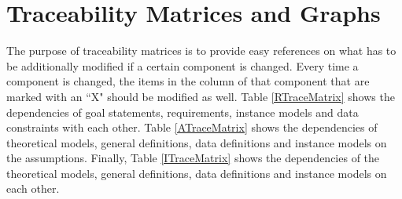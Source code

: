 \documentclass[12pt]{article}
\begin{document}
%
%

\section{Traceability Matrices and Graphs} \label{sec_tmag}

The purpose of traceability matrices is to provide easy references on what has to be additionally
modified if a certain component is changed. Every time a component is changed, the items in the
column of that component that are marked with an ``X" should be modified as well.
Table \ref{RTraceMatrix} shows the dependencies of goal statements, requirements, instance 
models and data constraints with each other. Table \ref{ATraceMatrix} shows the dependencies
of theoretical models, general definitions, data definitions and instance models on the assumptions.
Finally, Table \ref{ITraceMatrix} shows the dependencies of the theoretical models, general definitions,
data definitions and instance models on each other. \\
\end{document}
